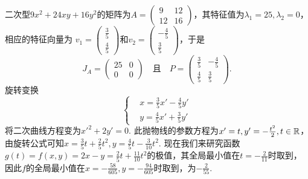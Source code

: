 \begin{solution}
\begin{inparaenum}[(a)]
    \item 二次型$9x^2+24xy+16y^2$的矩阵为$A=\begin{pmatrix}
          9 & 12 \\
          12 & 16
        \end{pmatrix}$，其特征值为$\lambda_1=25,\lambda_2=0$，相应的特征向量为
        $ v_1=\begin{pmatrix}
          \frac35 \\
          \frac45
        \end{pmatrix}$和$v_2=\begin{pmatrix}
          -\frac45 \\
          \frac35
        \end{pmatrix}$，于是
        \[
          J_A = \begin{pmatrix}
            25 & 0 \\
            0 & 0
          \end{pmatrix} \quad \text{且} \quad
          P = \begin{pmatrix}
            \frac35 & -\frac45 \\
            \frac45 & \frac35
          \end{pmatrix}.
        \]
    旋转变换
       \[
         \left\{
           \begin{aligned}
             & x = \frac35x' - \frac45y' \\
             & y = \frac45x' + \frac35y'
           \end{aligned}
         \right.
       \]
    将二次曲线方程变为$x'^2+2y'=0$. 此抛物线的参数方程为$x'=t,y'=-\frac{t^2}2,t\in\mathbb R$，由旋转公式可知$x=\frac35t+\frac25t^2,y=\frac45t-\frac3{10}t^2$. 现在我们来研究函数$g(t)=f(x,y)=2x-y=\frac25t+\frac{11}{10}t^2$的极值，其全局最小值在$t=-\frac2{11}$时取到，因此$f$的全局最小值在$x=-\frac{58}{605},y=-\frac{94}{605}$时取到，为$-\frac2{55}$.
  \end{inparaenum}
\end{solution}


